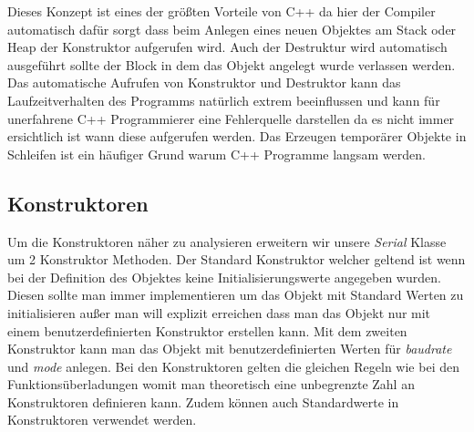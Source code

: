 \documentclass[MES,Master,ngerman]{twbook}%
\begin{document}
\begin{figure}[!htb]
	\begin{subfigure}[b]{0.5\textwidth}
		
		\label{fig:23}
	\end{subfigure}
	\begin{subfigure}[b]{0.5\textwidth}
		
		\label{fig:24}
	\end{subfigure}
\end{figure}
\newpage

Dieses Konzept ist eines der größten Vorteile von C++ da hier der Compiler automatisch dafür sorgt dass beim Anlegen eines neuen Objektes am Stack oder Heap der Konstruktor aufgerufen wird. Auch der Destruktur wird automatisch ausgeführt sollte der Block in dem das Objekt angelegt wurde verlassen werden. Das automatische Aufrufen von Konstruktor und Destruktor kann das Laufzeitverhalten des Programms natürlich extrem beeinflussen und kann für unerfahrene C++ Programmierer eine Fehlerquelle darstellen da es nicht immer ersichtlich ist wann diese aufgerufen werden. Das Erzeugen temporärer Objekte in Schleifen ist ein häufiger Grund warum C++ Programme langsam werden. 



\subsection{Konstruktoren}
Um die Konstruktoren näher zu analysieren erweitern wir unsere \textit{Serial} Klasse um 2 Konstruktor Methoden. Der Standard Konstruktor welcher geltend ist wenn bei der Definition des Objektes keine Initialisierungswerte angegeben wurden. Diesen sollte man immer implementieren um das Objekt mit Standard Werten zu initialisieren außer man will explizit erreichen dass man das Objekt nur mit einem benutzerdefinierten Konstruktor erstellen kann. Mit dem zweiten Konstruktor kann man das Objekt mit benutzerdefinierten Werten für \textit{baudrate} und \textit{mode} anlegen. Bei den Konstruktoren gelten die gleichen Regeln wie bei den Funktionsüberladungen womit man theoretisch eine unbegrenzte Zahl an Konstruktoren definieren kann. Zudem können auch Standardwerte in Konstruktoren verwendet werden. 
\end{document}
